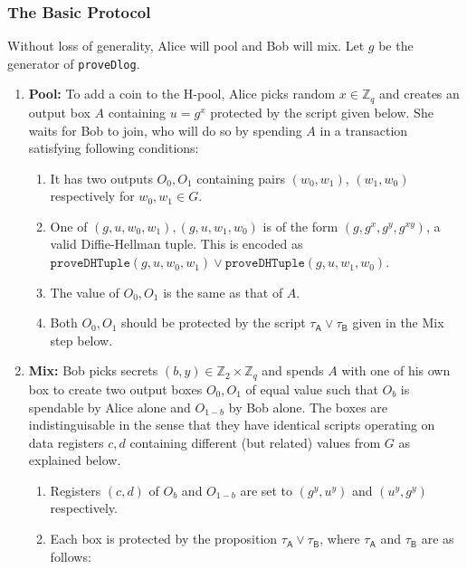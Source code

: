 \documentclass[11pt]{article}
\begin{document}
\subsubsection{The Basic Protocol}
 Without loss of generality, Alice will pool and Bob will mix. 
Let $g$ be the generator of \texttt{proveDlog}.
\begin{enumerate}
	\item \textbf{Pool:} To add a coin to the H-pool, Alice picks random $x\in \mathbb{Z}_q$ and creates an output box $A$ containing $u = g^x$ protected by the script given below. She waits for Bob to join, who will do so by spending $A$ in a transaction satisfying following conditions: 
	
	\begin{enumerate}
		\item It has two outputs $O_0, O_1$ containing pairs $(w_0, w_1)$, $(w_1, w_0)$ respectively for $w_0, w_1\in G$. 
		\item One of $(g, u, w_0, w_1), (g, u, w_1, w_0)$ is of the form $(g, g^x, g^y, g^{xy})$, a valid Diffie-Hellman tuple. This is encoded as $\texttt{proveDHTuple}(g, u, w_0, w_1)\lor \texttt{proveDHTuple}(g, u, w_1, w_0)$.
		\item The value of $O_0, O_1$ is the same as that of $A$.
		\item Both $O_0, O_1$ should be protected by the script $\tau_\textsf{A} \lor \tau_\textsf{B}$ given in the Mix step below.
	\end{enumerate}
	
	
	\item \textbf{Mix:} Bob picks secrets $(b, y) \in \mathbb{Z}_2\times \mathbb{Z}_q$ and spends $A$ with one of his own box to create two output boxes $O_0, O_1$ of equal value such that $O_b$ is spendable by Alice alone and $O_{1-b}$ by Bob alone. 
	The boxes are indistinguisable in the sense that they have identical scripts operating on  data registers $c, d$ containing different (but related) values from $G$ as explained below. 
	\begin{enumerate}
		\item %
		Registers $(c, d)$ of $O_b$ and $O_{1-b}$ are set to $(g^y, u^y)$ and $(u^y, g^y)$ respectively. 
		\item Each box is protected by the proposition $\tau_\textsf{A} \lor \tau_\textsf{B}$, where $\tau_\textsf{A}$ and $\tau_\textsf{B}$ are as follows: 


\end{enumerate}
\end{enumerate}
\end{document}
